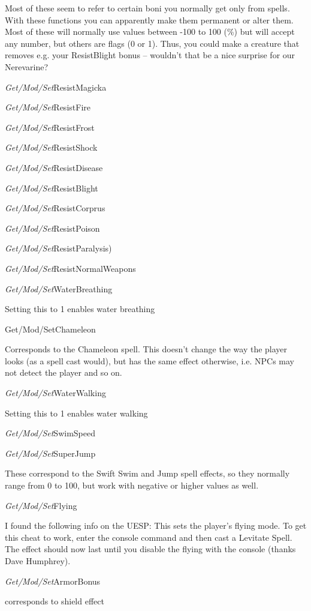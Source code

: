 Most of these seem to refer to certain boni you normally get only from
spells. With these functions you can apparently make them permanent or
alter them. Most of these will normally use values between -100 to 100
(\%) but will accept any number, but others are flags (0 or 1). Thus,
you could make a creature that removes e.g. your ResistBlight bonus --
wouldn't that be a nice surprise for our Nerevarine?

\emph{Get/Mod/Set}ResistMagicka

\emph{Get/Mod/Set}ResistFire

\emph{Get/Mod/Set}ResistFrost

\emph{Get/Mod/Set}ResistShock

\emph{Get/Mod/Set}ResistDisease

\emph{Get/Mod/Set}ResistBlight

\emph{Get/Mod/Set}ResistCorprus

\emph{Get/Mod/Set}ResistPoison

\emph{Get/Mod/Set}ResistParalysis)

\emph{Get/Mod/Set}ResistNormalWeapons

\emph{Get/Mod/Set}WaterBreathing

Setting this to 1 enables water breathing

Get/Mod/SetChameleon

Corresponds to the Chameleon spell. This doesn't change the way the
player looks (as a spell cast would), but has the same effect otherwise,
i.e. NPCs may not detect the player and so on.

\emph{Get/Mod/Set}WaterWalking

Setting this to 1 enables water walking

\emph{Get/Mod/Set}SwimSpeed

\emph{Get/Mod/Set}SuperJump

These correspond to the Swift Swim and Jump spell effects, so they
normally range from 0 to 100, but work with negative or higher values as
well.

\emph{Get/Mod/Set}Flying

I found the following info on the UESP: This sets the player's flying
mode. To get this cheat to work, enter the console command and then cast
a Levitate Spell. The effect should now last until you disable the
flying with the console (thanks Dave Humphrey).

\emph{Get/Mod/Set}ArmorBonus

corresponds to shield effect

